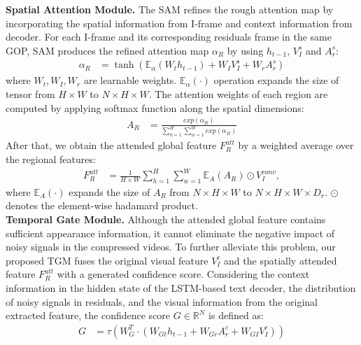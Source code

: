 \documentclass[a4paper,conference]{IEEEtran}
\begin{document}
\textbf{Spatial Attention Module.}  The SAM refines the rough attention map by incorporating the spatial information from I-frame and context information from decoder. For each I-frame and its corresponding residuals frame in the same GOP, SAM produces the refined attention map $\alpha_{R}$ by using $h_{t-1}$, $V_I^s$ and $A_r^s$:
\begin{equation}
\begin{aligned}
\alpha_{R} &= \tanh(\mathbb{E}_{\alpha} (W_{t} h_{t-1}) + W_{I} V_I^{s} + W_{r} A_{r}^{s} )\label{eq:alpha_R}
\end{aligned}
\end{equation}
where $W_{t}, W_{I}, W_{r}$ are learnable weights. $\mathbb{E}_{\alpha} (\cdot)$ operation expands the size of tensor from  $H \times W$ to $N \times H \times W$.
The attention weights of each region are computed by applying softmax function along the spatial dimensions:
\begin{equation}
\begin{aligned}
A_{R} &=\frac{exp(\alpha_{R})}{\sum_{h=1}^{H}\sum_{w=1}^{W} exp(\alpha_{R})}
\end{aligned}
\end{equation}
After that, we obtain the attended global feature $F_{R}^{att}$ by a weighted average over the regional features:
\begin{equation}
\begin{aligned}
F_{R}^{att} &=  \frac{1}{H \times W}\sum^{H}_{h=1} \sum^{W}_{w=1} \mathbb{E}_{A}({A_{R}}) \odot V_{I}^{conv},
\end{aligned}
\end{equation}
where $\mathbb{E}_{A}(\cdot)$ expands the size of $A_R$ from $N \times H \times W$ to $N \times H \times W \times D_r$. $\odot$ denotes the element-wise hadamard product.\\
\textbf{Temporal Gate Module.} Although the attended global feature contains sufficient appearance information, it cannot eliminate the negative impact of noisy signals in the compressed videos. To further alleviate this problem, our proposed TGM fuses the original visual feature $V_{I}^{c}$ and the spatially attended feature $F_{R}^{att}$ with a generated confidence score.
Considering the context information in the hidden state of the LSTM-based text decoder, the distribution of noisy signals in residuals, and the visual information from the original extracted feature, the confidence score $G \in \mathbb{R}^{N}$ is defined as:
\begin{equation}
\begin{aligned}
G &= \tau (W_G^{T} \cdot ( W_{Gt} h_{t-1} + W_{Gr} A_{r}^{c} + W_{GI} V_I^c))
\end{aligned}
\end{equation}
\end{document}
